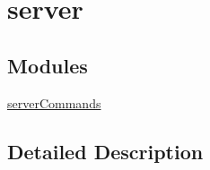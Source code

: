 \hypertarget{group___i_r_c_server}{\section{server}
\label{group___i_r_c_server}
}
\subsection*{Modules}
\begin{DoxyCompactItemize}
\item 
\hyperlink{group___i_r_c_server_commands}{server\-Commands}
\end{DoxyCompactItemize}


\subsection{Detailed Description}
